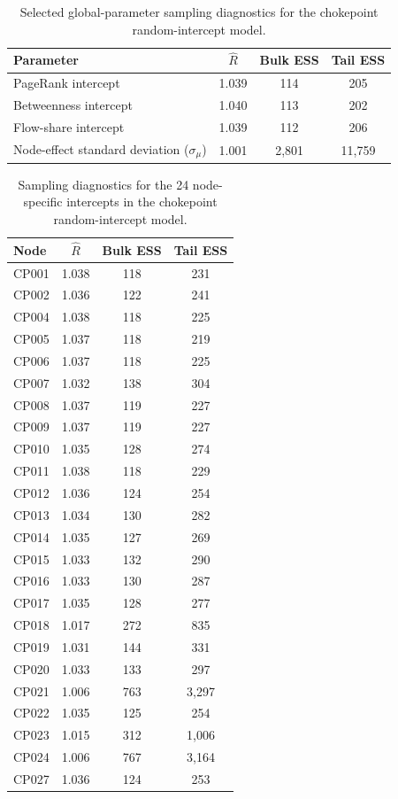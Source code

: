 \documentclass[pdftex,12pt,openright,a4paper,oneside]{book}
\begin{document}
\begin{table}[htbp]
\centering
\caption{Selected global-parameter sampling diagnostics
for the chokepoint random-intercept model.}
\label{tab:chokepoint_node_global_diagnostics}
\small
\begin{tabular}{lccc}
\hline
Parameter & $\widehat{R}$ & Bulk ESS & Tail ESS \\
\hline
PageRank intercept
& 1.039 & 114 & 205 \\

Betweenness intercept
& 1.040 & 113 & 202 \\

Flow-share intercept
& 1.039 & 112 & 206 \\

Node-effect standard deviation ($\sigma_\mu$)
& 1.001 & 2,801 & 11,759 \\
\hline
\end{tabular}
\end{table}

\begin{table}[H]
\centering
\caption{Sampling diagnostics for the 24 node-specific
intercepts in the chokepoint random-intercept model.}
\label{tab:chokepoint_node_intercept_diagnostics}
\small
\begin{tabular}{lccc}
\hline
Node & $\widehat{R}$ & Bulk ESS & Tail ESS \\
\hline
CP001 & 1.038 & 118 & 231 \\
CP002 & 1.036 & 122 & 241 \\
CP004 & 1.038 & 118 & 225 \\
CP005 & 1.037 & 118 & 219 \\
CP006 & 1.037 & 118 & 225 \\
CP007 & 1.032 & 138 & 304 \\
CP008 & 1.037 & 119 & 227 \\
CP009 & 1.037 & 119 & 227 \\
CP010 & 1.035 & 128 & 274 \\
CP011 & 1.038 & 118 & 229 \\
CP012 & 1.036 & 124 & 254 \\
CP013 & 1.034 & 130 & 282 \\
CP014 & 1.035 & 127 & 269 \\
CP015 & 1.033 & 132 & 290 \\
CP016 & 1.033 & 130 & 287 \\
CP017 & 1.035 & 128 & 277 \\
CP018 & 1.017 & 272 & 835 \\
CP019 & 1.031 & 144 & 331 \\
CP020 & 1.033 & 133 & 297 \\
CP021 & 1.006 & 763 & 3,297 \\
CP022 & 1.035 & 125 & 254 \\
CP023 & 1.015 & 312 & 1,006 \\
CP024 & 1.006 & 767 & 3,164 \\
CP027 & 1.036 & 124 & 253 \\
\hline
\end{tabular}
\end{table}
\end{document}
